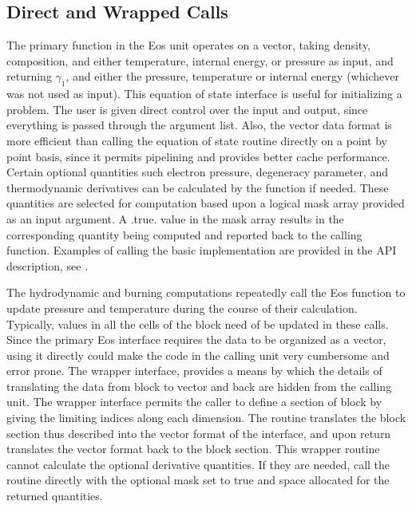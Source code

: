 \subsection{Direct and Wrapped Calls}
\label{Sec:Eos Wrapper}
The primary function in the \unit{Eos} unit%
operates on a vector, taking density, composition, and either
temperature, internal energy, or pressure as input, and returning
$\gamma_1$, and either the pressure, temperature or internal energy
(whichever was not used as input).
This equation of state interface is useful for initializing a
problem.  The user is given direct control over the input and output,
since everything is passed through the argument list. Also, the vector
data format is more efficient than calling the
equation of state routine directly on a point by point basis, since
it permits pipelining and provides better cache performance. Certain
optional quantities such electron pressure, degeneracy parameter, and
thermodynamic derivatives can be calculated by the
 function if needed. These quantities are
selected for computation based upon a logical mask array provided as
an input argument. A .true. value in the mask array results in the
corresponding quantity being computed and reported back to the calling
function.  Examples of calling the basic implementation  are provided in the API
description, see .

The hydrodynamic and burning computations repeatedly call the Eos function to
update pressure and temperature during the course of their
calculation. Typically, values in all the cells of the block need of
be updated in these calls. Since the primary Eos interface requires
the data to be organized as a vector, using it directly could make the
code in the calling unit very cumbersome and error prone. The wrapper
interface,  %
provides a means by which the
details of translating the data from block to vector and back are
hidden from the calling unit. The wrapper interface permits the caller
to define a section of block by giving the limiting indices along each
dimension. The  routine translates the
block section thus described into the vector format of the
 interface, and upon return translates the
vector format back to the block section. This wrapper routine cannot
calculate the optional derivative quantities.  If they are needed, call
the  routine directly with the optional mask set to true and space allocated
for the returned quantities.




